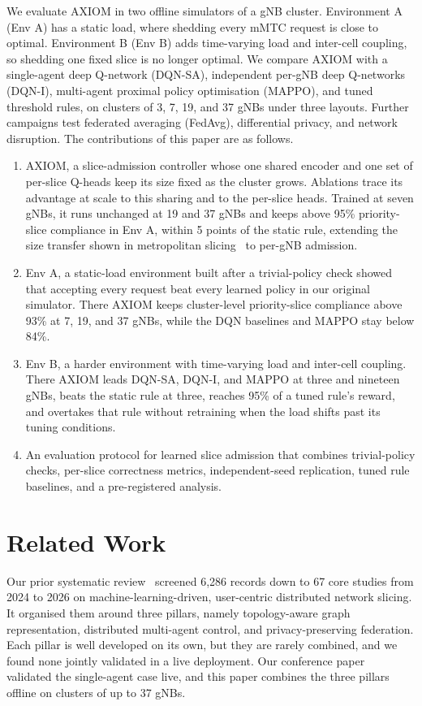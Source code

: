 \documentclass[pdflatex,sn-basic,Numbered]{sn-jnl}
\begin{document}
We evaluate AXIOM in two offline simulators of a gNB cluster. Environment A (Env A) has a static load, where shedding every mMTC request is close to optimal. Environment B (Env B) adds time-varying load and inter-cell coupling, so shedding one fixed slice is no longer optimal. We compare AXIOM with a single-agent deep Q-network (DQN-SA), independent per-gNB deep Q-networks (DQN-I), multi-agent proximal policy optimisation (MAPPO), and tuned threshold rules, on clusters of 3, 7, 19, and 37 gNBs under three layouts. Further campaigns test federated averaging (FedAvg), differential privacy, and network disruption. The contributions of this paper are as follows.
\begin{enumerate}
\item AXIOM, a slice-admission controller whose one shared encoder and one set of per-slice Q-heads keep its size fixed as the cluster grows. Ablations trace its advantage at scale to this sharing and to the per-slice heads. Trained at seven gNBs, it runs unchanged at 19 and 37 gNBs and keeps above 95\% priority-slice compliance in Env A, within 5 points of the static rule, extending the size transfer shown in metropolitan slicing~\cite{ahmadi2024generalizable} to per-gNB admission.
\item Env A, a static-load environment built after a trivial-policy check showed that accepting every request beat every learned policy in our original simulator. There AXIOM keeps cluster-level priority-slice compliance above 93\% at 7, 19, and 37 gNBs, while the DQN baselines and MAPPO stay below 84\%.
\item Env B, a harder environment with time-varying load and inter-cell coupling. There AXIOM leads DQN-SA, DQN-I, and MAPPO at three and nineteen gNBs, beats the static rule at three, reaches 95\% of a tuned rule's reward, and overtakes that rule without retraining when the load shifts past its tuning conditions.
\item An evaluation protocol for learned slice admission that combines trivial-policy checks, per-slice correctness metrics, independent-seed replication, tuned rule baselines, and a pre-registered analysis.
\end{enumerate}

\section{Related Work}
\label{sec:litreview}
Our prior systematic review~\cite{ref:access} screened 6{,}286 records down to 67 core studies from 2024 to 2026 on machine-learning-driven, user-centric distributed network slicing. It organised them around three pillars, namely topology-aware graph representation, distributed multi-agent control, and privacy-preserving federation. Each pillar is well developed on its own, but they are rarely combined, and we found none jointly validated in a live deployment. Our conference paper~\cite{cacs-paper4} validated the single-agent case live, and this paper combines the three pillars offline on clusters of up to 37 gNBs.
\end{document}
